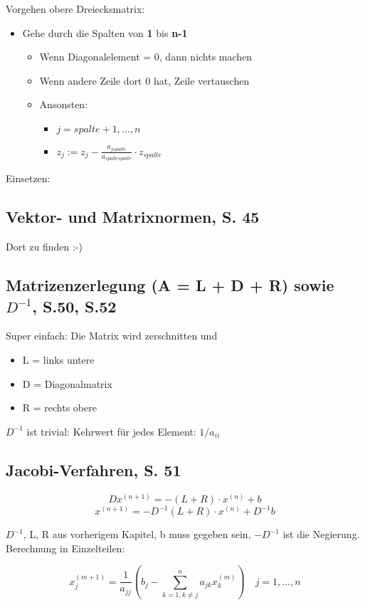 Vorgehen obere Dreiecksmatrix:
\begin{itemize}
\item Gehe durch die Spalten von \textbf{1} bis \textbf{n-1}
\begin{itemize}
\item Wenn Diagonalelement = 0, dann nichts machen
\item Wenn andere Zeile dort 0 hat, Zeile vertauschen
\item Ansonsten:
\begin{itemize}
\item $j = spalte + 1, ..., n$
\item $z_j := z_j - \frac{a_{jspalte}}{a_{spaltespalte}} \cdot z_{spalte}$
\end{itemize}
\end{itemize}
\end{itemize}
Einsetzen:

\subsection{Vektor- und Matrixnormen, S. 45}
Dort zu finden :-)

\subsection{Matrizenzerlegung (A = L + D + R) sowie $D^{-1}$, S.50, S.52}
Super einfach: Die Matrix wird zerschnitten und
\begin{itemize}
\item L = links untere
\item D = Diagonalmatrix
\item R = rechts obere
\end{itemize}

$D^{-1}$ ist trivial: Kehrwert für jedes Element: $1/a_{ii}$

\subsection{Jacobi-Verfahren, S. 51}

\[D{x^{(n+1)}} = - (L+R) \cdot x^{(n)} + b\]
\[{x^{(n+1)}} = -D^{-1} (L+R) \cdot x^{(n)} + D^{-1} b\]

$D^{-1}$, L, R aus vorherigem Kapitel, b muss gegeben sein,
$-D^{-1}$ ist die Negierung. Berechnung in Einzelteilen:

\[
x_j^{(m+1)} = \frac{1}{a_{jj}} \left( b_j - \displaystyle\sum\limits_{k=1, k \neq j}^n a_{jk}x_{k}^{(m)} \right) \quad j = 1, ..., n
\]
